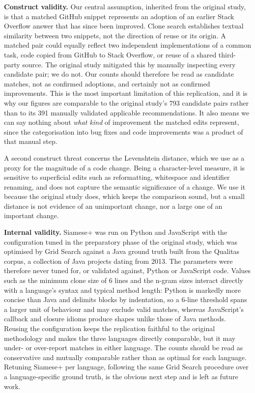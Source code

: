 \documentclass[onecolumn,11pt]{IEEEtran}
\begin{document}
\textbf{Construct validity.}
Our central assumption, inherited from the original study, is that a matched GitHub snippet represents an adoption of an earlier Stack Overflow answer that has since been improved.
Clone search establishes textual similarity between two snippets, not the direction of reuse or its origin.
A matched pair could equally reflect two independent implementations of a common task, code copied from GitHub to Stack Overflow, or reuse of a shared third-party source.
The original study mitigated this by manually inspecting every candidate pair; we do not.
Our counts should therefore be read as candidate matches, not as confirmed adoptions, and certainly not as confirmed improvements.
This is the most important limitation of this replication, and it is why our figures are comparable to the original study's 793 candidate pairs rather than to its 391 manually validated applicable recommendations.
It also means we can say nothing about \emph{what kind} of improvement the matched edits represent, since the categorisation into bug fixes and code improvements was a product of that manual step.

A second construct threat concerns the Levenshtein distance, which we use as a proxy for the magnitude of a code change.
Being a character-level measure, it is sensitive to superficial edits such as reformatting, whitespace and identifier renaming, and does not capture the semantic significance of a change.
We use it because the original study does, which keeps the comparison sound, but a small distance is not evidence of an unimportant change, nor a large one of an important change.

\textbf{Internal validity.}
Siamese+ was run on Python and JavaScript with the configuration tuned in the preparatory phase of the original study, which was optimised by Grid Search against a Java ground truth built from the Qualitas corpus, a collection of Java projects dating from 2013.
The parameters were therefore never tuned for, or validated against, Python or JavaScript code.
Values such as the minimum clone size of 6 lines and the n-gram sizes interact directly with a language's syntax and typical method length: Python is markedly more concise than Java and delimits blocks by indentation, so a 6-line threshold spans a larger unit of behaviour and may exclude valid matches, whereas JavaScript's callback and closure idioms produce shapes unlike those of Java methods.
Reusing the configuration keeps the replication faithful to the original methodology and makes the three languages directly comparable, but it may under- or over-report matches in either language.
The counts should be read as conservative and mutually comparable rather than as optimal for each language.
Retuning Siamese+ per language, following the same Grid Search procedure over a language-specific ground truth, is the obvious next step and is left as future work.
\end{document}
